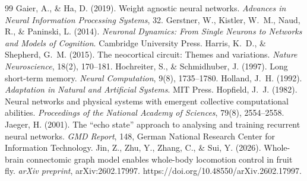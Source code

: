 \documentclass[10pt]{article}
\begin{document}
\begin{thebibliography}{99}
Gaier, A., \& Ha, D. (2019). Weight agnostic neural networks. \textit{Advances in Neural Information Processing Systems}, 32.
Gerstner, W., Kistler, W.~M., Naud, R., \& Paninski, L. (2014). \textit{Neuronal Dynamics: From Single Neurons to Networks and Models of Cognition}. Cambridge University Press.
Harris, K.~D., \& Shepherd, G.~M. (2015). The neocortical circuit: Themes and variations. \textit{Nature Neuroscience}, 18(2), 170--181.
Hochreiter, S., \& Schmidhuber, J. (1997). Long short-term memory. \textit{Neural Computation}, 9(8), 1735--1780.
Holland, J.~H. (1992). \textit{Adaptation in Natural and Artificial Systems}. MIT Press.
Hopfield, J.~J. (1982). Neural networks and physical systems with emergent collective computational abilities. \textit{Proceedings of the National Academy of Sciences}, 79(8), 2554--2558.
Jaeger, H. (2001). The ``echo state'' approach to analysing and training recurrent neural networks. \textit{GMD Report}, 148, German National Research Center for Information Technology.
Jin, Z., Zhu, Y., Zhang, C., \& Sui, Y. (2026). Whole-brain connectomic graph model enables whole-body locomotion control in fruit fly. \textit{arXiv preprint}, arXiv:2602.17997. https://doi.org/10.48550/arXiv.2602.17997.


\end{thebibliography}
\end{document}
